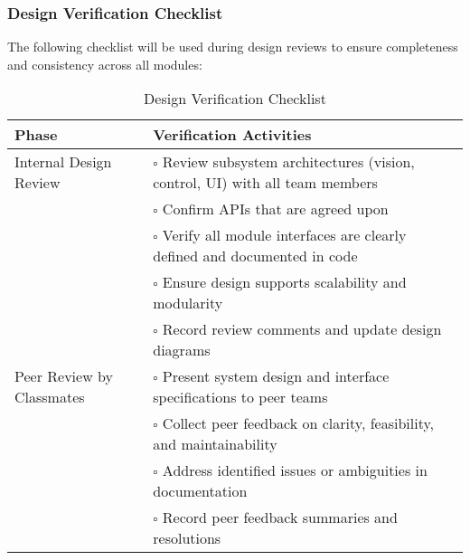 \documentclass[12pt, titlepage]{article}
\begin{document}
\subsubsection*{Design Verification Checklist}
The following checklist will be used during design reviews to ensure
completeness and consistency across all modules:

\newpage

\begin{table}[H]
  \centering
  \caption{Design Verification Checklist}
  \label{tab:design_verification_checklist}
  \renewcommand{\arraystretch}{1.3}
  \setlength{\tabcolsep}{8pt}
  \begin{tabular}{|p{4.4cm}|p{10.1cm}|}
    \hline
    \textbf{Phase}            & \textbf{Verification Activities}                                                         \\ \hline

    Internal Design Review    & $\square$ \; Review subsystem architectures (vision,
    control, UI) with all team members                                                                                   \\[-2pt]
                              & $\square$ \; Confirm APIs that are agreed upon                                           \\[-2pt]
                              & $\square$ \; Verify all module interfaces are clearly defined and documented in code     \\[-2pt]
                              & $\square$ \; Ensure design supports scalability and modularity                           \\[-2pt]
                              & $\square$ \; Record review comments and update design diagrams                           \\ \hline

    Peer Review by Classmates & $\square$ \; Present system design and interface
    specifications to peer teams                                                                                         \\[-2pt]
                              & $\square$ \; Collect peer feedback on clarity, feasibility, and maintainability          \\[-2pt]
                              & $\square$ \; Address identified issues or ambiguities in documentation                   \\[-2pt]
                              & $\square$ \; Record peer feedback summaries and resolutions                              \\ \hline


\end{tabular}
\end{table}
\end{document}
